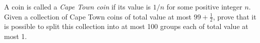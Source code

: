 A coin is called a \emph{Cape Town coin} if its value is $1/n$ for some positive integer $n$. Given a collection of Cape Town coins of total value at most $99 + \frac{1}{2}$, prove that it is possible to split this collection into at most 100 groups each of total value at most 1.
